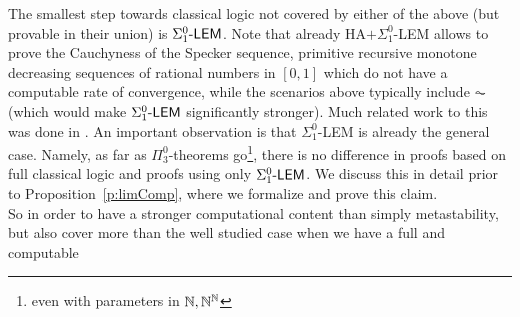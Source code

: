 The smallest step towards classical logic not covered by either of the 
above (but provable in their union) is $\Sigma^0_1\textsf{\upshape -LEM}$.
Note that already HA$+\Sigma^0_1$-LEM 
allows to prove the Cauchyness of the Specker sequence, primitive recursive 
monotone decreasing sequences of rational numbers in $[0,1]$ which do not 
have a computable rate of convergence, while the scenarios above
typically include $\AC$ (which would make $\Sigma^0_1\textsf{\upshape -LEM}$ significantly stronger).
Much related work to this was done in 
\cite{Toftdal, Akama, Hayashi/Nakata, Coquand,Berardi/Coquand/Hayashi, Aschieri/Berardi,Aschieri1,Aschieri2}.
An important observation is that $\Sigma^0_1$-LEM is already the general case. 
Namely, as far as $\Pi^0_3$-theorems go\footnote{even
with parameters in $\mathbb{N},\mathbb{N}^{\mathbb{N}}$}, 
there is no difference in proofs based 
on full classical logic and proofs using only $\Sigma^0_1\textsf{\upshape -LEM}$. 
We discuss this in detail prior to Proposition~\ref{p:limComp}, where 
we formalize and prove this claim.\\
So in order to have a stronger computational content than simply metastability, but
also cover more than the well studied case when we have a full and computable
